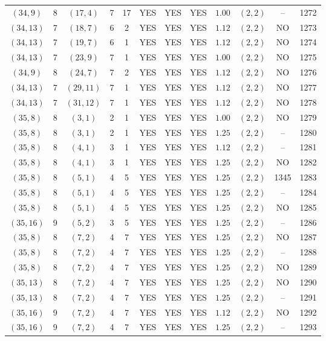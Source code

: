 \begin{longtable}{|c|c|c|c|c|c|c|c|c|c|c|c|}
$(34,9)$ & 8 & $(17,4)$ & 7 & 17 & YES & YES & YES & $1.00$ & $(2,2)$ & -- & 1272\\
$(34,13)$ & 7 & $(18,7)$ & 6 & 2 & YES & YES & YES & $1.12$ & $(2,2)$ & NO & 1273\\
$(34,13)$ & 7 & $(19,7)$ & 6 & 1 & YES & YES & YES & $1.12$ & $(2,2)$ & NO & 1274\\
$(34,13)$ & 7 & $(23,9)$ & 7 & 1 & YES & YES & YES & $1.00$ & $(2,2)$ & NO & 1275\\
$(34,9)$ & 8 & $(24,7)$ & 7 & 2 & YES & YES & YES & $1.12$ & $(2,2)$ & NO & 1276\\
$(34,13)$ & 7 & $(29,11)$ & 7 & 1 & YES & YES & YES & $1.12$ & $(2,2)$ & NO & 1277\\
$(34,13)$ & 7 & $(31,12)$ & 7 & 1 & YES & YES & YES & $1.12$ & $(2,2)$ & NO & 1278\\
$(35,8)$ & 8 & $(3,1)$ & 2 & 1 & YES & YES & YES & $1.00$ & $(2,2)$ & NO & 1279\\
$(35,8)$ & 8 & $(3,1)$ & 2 & 1 & YES & YES & YES & $1.25$ & $(2,2)$ & -- & 1280\\
$(35,8)$ & 8 & $(4,1)$ & 3 & 1 & YES & YES & YES & $1.12$ & $(2,2)$ & -- & 1281\\
$(35,8)$ & 8 & $(4,1)$ & 3 & 1 & YES & YES & YES & $1.25$ & $(2,2)$ & NO & 1282\\
$(35,8)$ & 8 & $(5,1)$ & 4 & 5 & YES & YES & YES & $1.25$ & $(2,2)$ & 1345 & 1283\\
$(35,8)$ & 8 & $(5,1)$ & 4 & 5 & YES & YES & YES & $1.25$ & $(2,2)$ & -- & 1284\\
$(35,8)$ & 8 & $(5,1)$ & 4 & 5 & YES & YES & YES & $1.25$ & $(2,2)$ & NO & 1285\\
$(35,16)$ & 9 & $(5,2)$ & 3 & 5 & YES & YES & YES & $1.25$ & $(2,2)$ & -- & 1286\\
$(35,8)$ & 8 & $(7,2)$ & 4 & 7 & YES & YES & YES & $1.25$ & $(2,2)$ & NO & 1287\\
$(35,8)$ & 8 & $(7,2)$ & 4 & 7 & YES & YES & YES & $1.25$ & $(2,2)$ & -- & 1288\\
$(35,8)$ & 8 & $(7,2)$ & 4 & 7 & YES & YES & YES & $1.25$ & $(2,2)$ & NO & 1289\\
$(35,13)$ & 8 & $(7,2)$ & 4 & 7 & YES & YES & YES & $1.25$ & $(2,2)$ & NO & 1290\\
$(35,13)$ & 8 & $(7,2)$ & 4 & 7 & YES & YES & YES & $1.25$ & $(2,2)$ & -- & 1291\\
$(35,16)$ & 9 & $(7,2)$ & 4 & 7 & YES & YES & YES & $1.12$ & $(2,2)$ & NO & 1292\\
$(35,16)$ & 9 & $(7,2)$ & 4 & 7 & YES & YES & YES & $1.25$ & $(2,2)$ & -- & 1293\\

\end{longtable}
